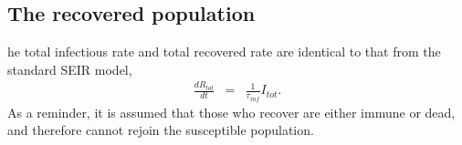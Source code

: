 \documentclass[notitlepage, superscriptaddress]{revtex4-2}
\begin{document}
\subsection{The recovered population}

he total infectious rate and total recovered rate are identical to that from the standard SEIR model,
\begin{eqnarray}
\label{E:dRtot}
%
\frac{dR_{tot}}{dt} &=& \frac{1}{\tau_{inf}}I_{tot}.
\end{eqnarray}
As a reminder, it is assumed that those who recover are either immune or dead, and therefore cannot rejoin the susceptible population. 

% 
\end{document}
